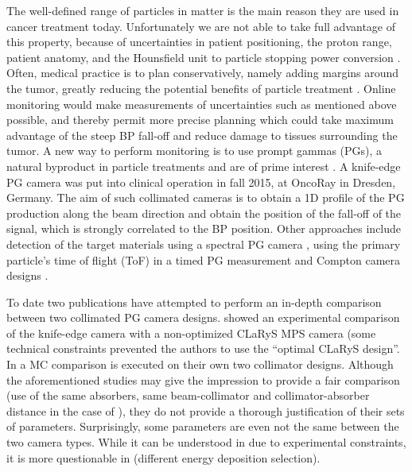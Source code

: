 \documentclass[a4paper,english]{article}
\begin{document}
The well-defined range of particles in matter is the main reason they are used in cancer treatment today. Unfortunately we are not able to take full advantage of this property, because of uncertainties in patient positioning, the proton range, patient anatomy, and the Hounsfield unit to particle stopping power conversion \citep{Paganetti2012}. Often, medical practice is to plan conservatively, namely adding margins around the tumor, greatly reducing the potential benefits of particle treatment \citep{Knopf2013}. Online monitoring would make measurements of uncertainties such as mentioned above possible, and thereby permit more precise planning which could take maximum advantage of the steep BP fall-off and reduce damage to tissues surrounding the tumor. A new way to perform monitoring is to use prompt gammas (PGs), a natural byproduct in particle treatments and are of prime interest \citep{Moteabbed2011,Gueth2013,Golnik2014a,Janssen2014}. A knife-edge PG camera \citep{Perali2014,Richter2016} was put into clinical operation in fall 2015, at OncoRay in Dresden, Germany. The aim of such collimated cameras is to obtain a 1D profile of the PG production along the beam direction and obtain the position of the fall-off of the signal, which is strongly correlated to the BP position. Other approaches include detection of the target materials using a spectral PG camera \citep{Verburg2014}, using the primary particle's time of flight (ToF) in a timed PG measurement \citep{Golnik2014a} and Compton camera designs \citep{Roellinghoff2011,Kurosawa2012,Solevi2016,Thirolf2016,Polf2015,Llosa2016}.

To date two publications have attempted to perform an in-depth comparison between two collimated PG camera designs. \cite{Smeets2016} showed an experimental comparison of the knife-edge camera with a non-optimized CLaRyS MPS camera (some technical constraints prevented the authors to use the \enquote{optimal CLaRyS design}. In \cite{Lin2017} a MC comparison is executed on their own two collimator designs. Although the aforementioned studies may give the impression to provide a fair comparison (use of the same absorbers, same beam-collimator and collimator-absorber distance in the case of \cite{Lin2017}), they do not provide a thorough justification of their sets of parameters. Surprisingly, some parameters are even not the same between the two camera types. While it can be understood in \cite{Smeets2016} due to experimental constraints, it is more questionable in \cite{Lin2017} (different energy deposition selection).
\end{document}
